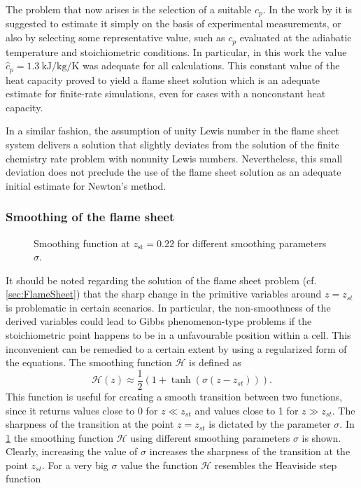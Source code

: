 The problem that now arises is the selection of a suitable $c_p$. In the work by \textcite{xuApplicationPrimitiveVariable1993} it is suggested to estimate it simply on the basis of experimental measurements, or also by selecting some representative value, such as $c_p$ evaluated at the adiabatic temperature and stoichiometric conditions. In particular, in this work the value $\hat c_p = \SI{1.3}{\kilo \joule \per \kilo \gram \per \kelvin}$ was adequate for all calculations. This constant value of the heat capacity proved to yield a flame sheet solution which is an adequate estimate for finite-rate simulations, even for cases with a nonconstant heat capacity. 

In a similar fashion, the assumption of unity Lewis number in the flame sheet system delivers a solution that slightly deviates from the solution of the finite chemistry rate problem with nonunity Lewis numbers. Nevertheless, this small deviation does not preclude the use of the flame sheet solution as an adequate initial estimate for Newton's method. 

\subsubsection{Smoothing of the flame sheet}
\begin{figure}[h]
	\centering
	\caption{Smoothing function  at $z_{\text{st}} = 0.22$ for different smoothing parameters $\sigma$. }\label{fig:SmoothingFunc}
\end{figure}
It should be noted regarding the solution of the flame sheet problem (cf. \cref{sec:FlameSheet}) that the sharp change in the primitive variables around $z = z_{st}$  is problematic in certain scenarios. In particular, the non-smoothness of the derived variables could lead to Gibbs phenomenon-type problems if the stoichiometric point happens to be in a unfavourable position within a cell. This inconvenient can be remedied to a certain extent by using a regularized form of the equations. The smoothing function $\mathcal{H}$ is defined as
\begin{equation}\label{eq:regularization_MF}
	\mathcal{H}(z) \approx \frac{1}{2}(1+\tanh(\sigma(z - z_{st}) )).
\end{equation}
This function is useful for creating a smooth transition between two functions, since it returns values close to 0 for $z \ll z_{st}$ and values close to 1 for $z \gg z_{st}$. The sharpness of the transition at the point $z = z_{st}$ is dictated by the parameter $\sigma$. In \cref{fig:SmoothingFunc} the smoothing function $\mathcal{H}$ using different smoothing parameters $\sigma$ is shown. Clearly, increasing the value of $\sigma$ increases the sharpness of the transition at the point $z_{st}$. For a very big $\sigma$ value the function $	\mathcal{H}$ resembles the Heaviside step function

